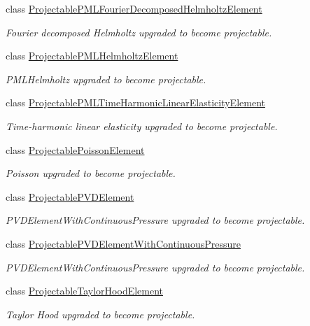 \begin{DoxyCompactItemize}
class \hyperlink{classoomph_1_1ProjectablePMLFourierDecomposedHelmholtzElement}{Projectable\+P\+M\+L\+Fourier\+Decomposed\+Helmholtz\+Element}
\begin{DoxyCompactList}\small\item\em Fourier decomposed Helmholtz upgraded to become projectable. \end{DoxyCompactList}\item 
class \hyperlink{classoomph_1_1ProjectablePMLHelmholtzElement}{Projectable\+P\+M\+L\+Helmholtz\+Element}
\begin{DoxyCompactList}\small\item\em P\+M\+L\+Helmholtz upgraded to become projectable. \end{DoxyCompactList}\item 
class \hyperlink{classoomph_1_1ProjectablePMLTimeHarmonicLinearElasticityElement}{Projectable\+P\+M\+L\+Time\+Harmonic\+Linear\+Elasticity\+Element}
\begin{DoxyCompactList}\small\item\em Time-\/harmonic linear elasticity upgraded to become projectable. \end{DoxyCompactList}\item 
class \hyperlink{classoomph_1_1ProjectablePoissonElement}{Projectable\+Poisson\+Element}
\begin{DoxyCompactList}\small\item\em Poisson upgraded to become projectable. \end{DoxyCompactList}\item 
class \hyperlink{classoomph_1_1ProjectablePVDElement}{Projectable\+P\+V\+D\+Element}
\begin{DoxyCompactList}\small\item\em P\+V\+D\+Element\+With\+Continuous\+Pressure upgraded to become projectable. \end{DoxyCompactList}\item 
class \hyperlink{classoomph_1_1ProjectablePVDElementWithContinuousPressure}{Projectable\+P\+V\+D\+Element\+With\+Continuous\+Pressure}
\begin{DoxyCompactList}\small\item\em P\+V\+D\+Element\+With\+Continuous\+Pressure upgraded to become projectable. \end{DoxyCompactList}\item 
class \hyperlink{classoomph_1_1ProjectableTaylorHoodElement}{Projectable\+Taylor\+Hood\+Element}
\begin{DoxyCompactList}\small\item\em Taylor Hood upgraded to become projectable. \end{DoxyCompactList}\item 

\end{DoxyCompactItemize}
